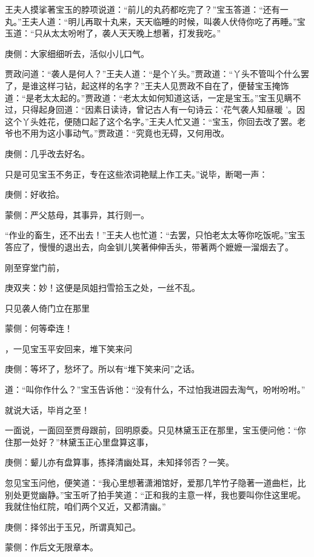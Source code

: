 \begin{parag}
    王夫人摸挲著宝玉的脖项说道：“前儿的丸药都吃完了？”宝玉答道：“还有一丸。”王夫人道：“明儿再取十丸来，天天临睡的时候，叫袭人伏侍你吃了再睡。”宝玉道：“只从太太吩咐了，袭人天天晚上想著，打发我吃。”\begin{note}庚侧：大家细细听去，活似小儿口气。\end{note}贾政问道：“袭人是何人？”王夫人道：“是个丫头。”贾政道：“丫头不管叫个什么罢了，是谁这样刁钻，起这样的名字？”王夫人见贾政不自在了，便替宝玉掩饰道：“是老太太起的。”贾政道：“老太太如何知道这话，一定是宝玉。”宝玉见瞒不过，只得起身回道：“因素日读诗，曾记古人有一句诗云：‘花气袭人知昼暖 ’。因这个丫头姓花，便随口起了这个名字。”王夫人忙又道：“宝玉，你回去改了罢。老爷也不用为这小事动气。”贾政道：“究竟也无碍，又何用改。\begin{note}庚侧：几乎改去好名。\end{note}只是可见宝玉不务正，专在这些浓词艳赋上作工夫。”说毕，断喝一声：\begin{note}庚侧：好收拾。\end{note}\begin{note}蒙侧：严父慈母，其事异，其行则一。\end{note}“作业的畜生，还不出去！”王夫人也忙道：“去罢，只怕老太太等你吃饭呢。”宝玉答应了，慢慢的退出去，向金钏儿笑著伸伸舌头，带著两个嬷嬷一溜烟去了。
\end{parag}


\begin{parag}
    刚至穿堂门前，\begin{note}庚双夹：妙！这便是凤姐扫雪拾玉之处，一丝不乱。\end{note}只见袭人倚门立在那里\begin{note}蒙侧：何等牵连！\end{note}，一见宝玉平安回来，堆下笑来问\begin{note}庚侧：等坏了，愁坏了。所以有“堆下笑来问”之话。\end{note}道：“叫你作什么？”宝玉告诉他：“没有什么，不过怕我进园去淘气，吩咐吩咐。”\begin{note}就说大话，毕肖之至！\end{note}一面说，一面回至贾母跟前，回明原委。只见林黛玉正在那里，宝玉便问他：“你住那一处好？”林黛玉正心里盘算这事，\begin{note}庚侧：颦儿亦有盘算事，拣择清幽处耳，未知择邻否？一笑。\end{note}忽见宝玉问他，便笑道：“我心里想著潇湘馆好，爱那几竿竹子隐著一道曲栏，比别处更觉幽静。”宝玉听了拍手笑道：“正和我的主意一样，我也要叫你住这里呢。我就住怡红院，咱们两个又近，又都清幽。”\begin{note}庚侧：择邻出于玉兄，所谓真知己。\end{note}\begin{note}蒙侧：作后文无限章本。\end{note}
\end{parag}


